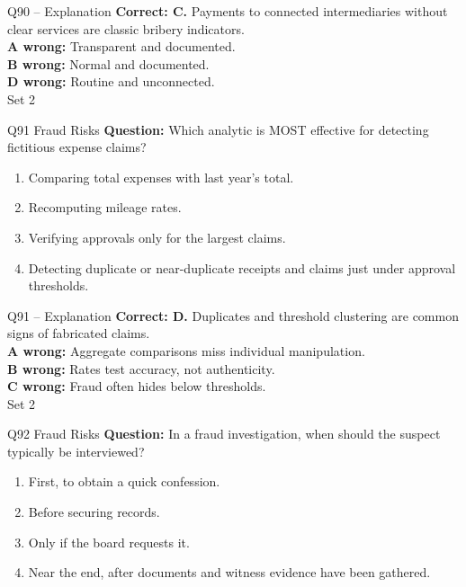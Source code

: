 \documentclass[aspectratio=169,10pt]{beamer}
\begin{document}
\begin{frame}[t]{Q90 -- Explanation}
	\footnotesize
	\textbf{Correct: C.} Payments to connected intermediaries without clear services are classic bribery indicators. \\[5pt]
\textbf{A wrong:} Transparent and documented. \\[3pt]
\textbf{B wrong:} Normal and documented. \\[3pt]
\textbf{D wrong:} Routine and unconnected. \\[3pt]
	\vfill {\tiny Set 2}
\end{frame}

\begin{frame}[t]{Q91 \hfill {\scriptsize Fraud Risks}}
	\small
	\textbf{Question:} Which analytic is MOST effective for detecting fictitious expense claims?
	\begin{enumerate}[label=\Alph*.,itemsep=1pt,topsep=3pt]
			\item Comparing total expenses with last year's total.
			\item Recomputing mileage rates.
			\item Verifying approvals only for the largest claims.
			\item Detecting duplicate or near-duplicate receipts and claims just under approval thresholds.
	\end{enumerate}
\end{frame}

\begin{frame}[t]{Q91 -- Explanation}
	\footnotesize
	\textbf{Correct: D.} Duplicates and threshold clustering are common signs of fabricated claims. \\[5pt]
\textbf{A wrong:} Aggregate comparisons miss individual manipulation. \\[3pt]
\textbf{B wrong:} Rates test accuracy, not authenticity. \\[3pt]
\textbf{C wrong:} Fraud often hides below thresholds. \\[3pt]
	\vfill {\tiny Set 2}
\end{frame}

\begin{frame}[t]{Q92 \hfill {\scriptsize Fraud Risks}}
	\small
	\textbf{Question:} In a fraud investigation, when should the suspect typically be interviewed?
	\begin{enumerate}[label=\Alph*.,itemsep=1pt,topsep=3pt]
			\item First, to obtain a quick confession.
			\item Before securing records.
			\item Only if the board requests it.
			\item Near the end, after documents and witness evidence have been gathered.
	\end{enumerate}
\end{frame}
\end{document}
